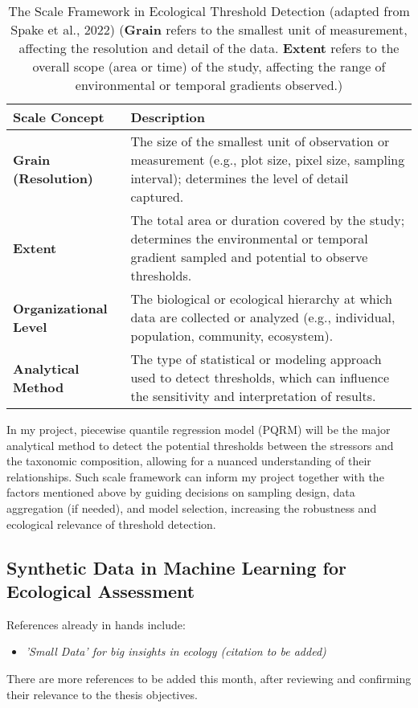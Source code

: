 \begin{table}[h!]
\centering
\caption{The Scale Framework in Ecological Threshold Detection (adapted from Spake et al., 2022)
(\textbf{Grain} refers to the smallest unit of measurement, affecting the resolution and 
detail of the data. \textbf{Extent} refers to the overall scope (area or time) of the
study, affecting the range of environmental or temporal gradients observed.)
}
\label{tab:scale_framework}
\renewcommand{\arraystretch}{2.2}
\begin{tabular}{|m{3.5cm}|m{11cm}|}
\hline
\centering\textbf{Scale Concept} & \centering\textbf{Description} \tabularnewline
\hline
\centering\textbf{Grain (Resolution)} & The size of the smallest unit of observation or measurement (e.g., plot size, pixel size, sampling interval); determines the level of detail captured. \tabularnewline
\hline
\centering\textbf{Extent} & The total area or duration covered by the study; determines the environmental or temporal gradient sampled and potential to observe thresholds. \tabularnewline
\hline
\centering\textbf{Organizational Level} & The biological or ecological hierarchy at which data are collected or analyzed (e.g., individual, population, community, ecosystem). \tabularnewline
\hline
\centering\textbf{Analytical Method} & The type of statistical or modeling approach used to detect thresholds, which can influence the sensitivity and interpretation of results. \tabularnewline
\hline
\end{tabular}
\end{table}


In my project, piecewise quantile regression model (PQRM) will be the major analytical method to detect the
potential thresholds between the stressors and the taxonomic composition, 
allowing for a nuanced understanding of their relationships. Such scale framework can inform my project together with the factors mentioned above by guiding decisions on sampling design,
data aggregation (if needed), and model selection, increasing the robustness and ecological relevance of threshold detection.




\subsection{Synthetic Data in Machine Learning for Ecological Assessment}


References already in hands include:
\begin{itemize}
    \item \textit{'Small Data' for big insights in ecology (citation to be added)}
\end{itemize}

There are more references to be added this month, after reviewing and confirming their relevance to the thesis objectives.

